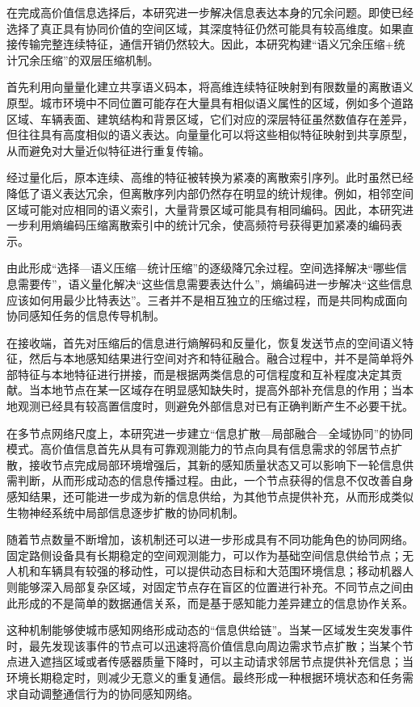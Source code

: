 在完成高价值信息选择后，本研究进一步解决信息表达本身的冗余问题。即使已经选择了真正具有协同价值的空间区域，其深度特征仍然可能具有较高维度。如果直接传输完整连续特征，通信开销仍然较大。因此，本研究构建“语义冗余压缩+统计冗余压缩”的双层压缩机制。

首先利用向量量化建立共享语义码本，将高维连续特征映射到有限数量的离散语义原型。城市环境中不同位置可能存在大量具有相似语义属性的区域，例如多个道路区域、车辆表面、建筑结构和背景区域，它们对应的深层特征虽然数值存在差异，但往往具有高度相似的语义表达。向量量化可以将这些相似特征映射到共享原型，从而避免对大量近似特征进行重复传输。

经过量化后，原本连续、高维的特征被转换为紧凑的离散索引序列。此时虽然已经降低了语义表达冗余，但离散序列内部仍然存在明显的统计规律。例如，相邻空间区域可能对应相同的语义索引，大量背景区域可能具有相同编码。因此，本研究进一步利用熵编码压缩离散索引中的统计冗余，使高频符号获得更加紧凑的编码表示。

由此形成“选择—语义压缩—统计压缩”的逐级降冗余过程。空间选择解决“哪些信息需要传”，语义量化解决“这些信息需要表达什么”，熵编码进一步解决“这些信息应该如何用最少比特表达”。三者并不是相互独立的压缩过程，而是共同构成面向协同感知任务的信息传导机制。

在接收端，首先对压缩后的信息进行熵解码和反量化，恢复发送节点的空间语义特征，然后与本地感知结果进行空间对齐和特征融合。融合过程中，并不是简单将外部特征与本地特征进行拼接，而是根据两类信息的可信程度和互补程度决定其贡献。当本地节点在某一区域存在明显感知缺失时，提高外部补充信息的作用；当本地观测已经具有较高置信度时，则避免外部信息对已有正确判断产生不必要干扰。

在多节点网络尺度上，本研究进一步建立“信息扩散—局部融合—全域协同”的协同模式。高价值信息首先从具有可靠观测能力的节点向具有信息需求的邻居节点扩散，接收节点完成局部环境增强后，其新的感知质量状态又可以影响下一轮信息供需判断，从而形成动态的信息传播过程。由此，一个节点获得的信息不仅改善自身感知结果，还可能进一步成为新的信息供给，为其他节点提供补充，从而形成类似生物神经系统中局部信息逐步扩散的协同机制。

随着节点数量不断增加，该机制还可以进一步形成具有不同功能角色的协同网络。固定路侧设备具有长期稳定的空间观测能力，可以作为基础空间信息供给节点；无人机和车辆具有较强的移动性，可以提供动态目标和大范围环境信息；移动机器人则能够深入局部复杂区域，对固定节点存在盲区的位置进行补充。不同节点之间由此形成的不是简单的数据通信关系，而是基于感知能力差异建立的信息协作关系。

这种机制能够使城市感知网络形成动态的“信息供给链”。当某一区域发生突发事件时，最先发现该事件的节点可以迅速将高价值信息向周边需求节点扩散；当某个节点进入遮挡区域或者传感器质量下降时，可以主动请求邻居节点提供补充信息；当环境长期稳定时，则减少无意义的重复通信。最终形成一种根据环境状态和任务需求自动调整通信行为的协同感知网络。

